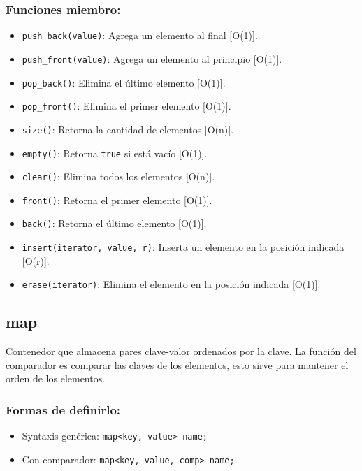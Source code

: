 \subsubsection{Funciones miembro:}
\begin{itemize}
  \item \texttt{push\_back(value)}: Agrega un elemento al final [O(1)].
  \item \texttt{push\_front(value)}: Agrega un elemento al principio [O(1)].
  \item \texttt{pop\_back()}: Elimina el último elemento [O(1)].
  \item \texttt{pop\_front()}: Elimina el primer elemento [O(1)].
  \item \texttt{size()}: Retorna la cantidad de elementos [O(n)].
  \item \texttt{empty()}: Retorna \texttt{true} si está vacío [O(1)].
  \item \texttt{clear()}: Elimina todos los elementos [O(n)].
  \item \texttt{front()}: Retorna el primer elemento [O(1)].
  \item \texttt{back()}: Retorna el último elemento [O(1)].
  \item \texttt{insert(iterator, value, r)}: Inserta un elemento en la posición indicada [O(r)].
  \item \texttt{erase(iterator)}: Elimina el elemento en la posición indicada [O(1)]. 
\end{itemize}

\subsection{map}
\label{subsec:std_map}
Contenedor que almacena pares clave-valor ordenados por la clave. La función del comparador es comparar las claves de los elementos, esto sirve para mantener el orden de los elementos.

\subsubsection{Formas de definirlo:}
\begin{itemize}
  \item Syntaxis genérica: \texttt{map<key, value> name;}
  \item Con comparador: \texttt{map<key, value, comp> name;}
\end{itemize}


